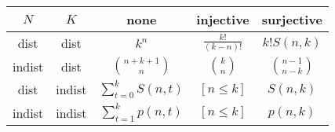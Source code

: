 \begin{center}
	\begin{tabular}{c@{\ }c|c@{\ }c@{\ }c}
		$N$ & $K$ & none & injective & surjective\\
		\hline
		dist & dist & $k^n$ & $\frac{k!}{(k-n)!}$ & $k!S(n, k)$\\
		indist & dist & $\binom{n+k+1}{n}$ & $\binom{k}{n}$ & $\binom{n-1}{n-k}$\\
		dist & indist & $\sum_{t=0}^{k} S(n,t)$ & $[n\le k]$ & $S(n,k)$\\
		indist & indist & $\sum_{t=1}^{k} p(n,t)$ & $[n\le k]$ & $p(n,k)$
	\end{tabular}\\
\end{center}
